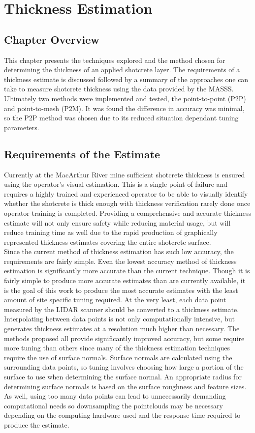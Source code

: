 \chapter{Thickness Estimation}
\label{chap:thick}
\section{Chapter Overview}
This chapter presents the techniques explored and the method chosen for determining the thickness of an applied shotcrete layer. The requirements of a thickness estimate is discussed followed by a summary of the approaches one can take to measure shotcrete thickness using the data provided by the MASSS. Ultimately two methods were implemented and tested, the point-to-point (P2P) and point-to-mesh (P2M). It was found the difference in accuracy was minimal, so the P2P method was chosen due to its reduced situation dependant tuning parameters.\\
\section{Requirements of the Estimate}
Currently at the MacArthur River mine sufficient shotcrete thickness is ensured using the operator's visual estimation. This is a single point of failure and requires a highly trained and experienced operator to be able to visually identify whether the shotcrete is thick enough with thickness verification rarely done once operator training is completed. Providing a comprehensive and accurate thickness estimate will not only ensure safety while reducing material usage, but will reduce training time as well due to the rapid production of graphically represented thickness estimates covering the entire shotcrete surface.\\

Since the current method of thickness estimation has such low accuracy, the requirements are fairly simple. Even the lowest accuracy method of thickness estimation is significantly more accurate than the current technique. Though it is fairly simple to produce more accurate estimates than are currently available, it is the goal of this work to produce the most accurate estimates with the least amount of site specific tuning required. At the very least, each data point measured by the LIDAR scanner should be converted to a thickness estimate. Interpolating between data points is not only computationally intensive, but generates thickness estimates at a resolution much higher than necessary. The methods proposed all provide significantly improved accuracy, but some require more tuning than others since many of the thickness estimation techniques require the use of surface normals. Surface normals are calculated using the surrounding data points, so tuning involves choosing how large a portion of the surface to use when determining the surface normal. An appropriate radius for determining surface normals is based on the surface roughness and feature sizes. As well, using too many data points can lead to unnecessarily demanding computational needs so downsampling the pointclouds may be necessary depending on the computing hardware used and the response time required to produce the estimate.\\

